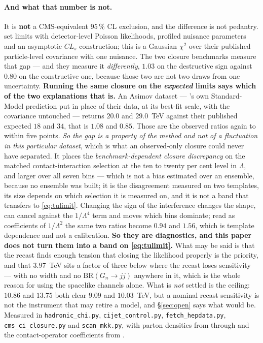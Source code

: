\documentclass[11pt,a4paper]{article}
\begin{document}
\paragraph{And what that number is not.} It is \textbf{not} a CMS-equivalent $95\,\%$ CL
exclusion, and the difference is not pedantry. \cite{CMSangular} set limits with detector-level
Poisson likelihoods, profiled nuisance parameters and an asymptotic $CL_s$ construction; this is a
Gaussian $\chi^2$ over their published particle-level covariance with one nuisance. The two
closure benchmarks measure that gap --- and they measure it \emph{differently}, $1.03$ on the
destructive sign against $0.80$ on the constructive one, because those two are not two draws from
one uncertainty. \textbf{Running the same closure on the \emph{expected} limits says which of the
two explanations that is.} An Asimov dataset --- \cite{CMSangular}'s own Standard-Model prediction
put in place of their data, at its best-fit scale, with the covariance untouched --- returns $20.0$
and $29.0$~TeV against their published expected $18$ and $34$, that is $1.08$ and $0.85$. Those
are the observed ratios again to within five points. \emph{So the gap is a property of the method
and not of a fluctuation in this particular dataset}, which is what an observed-only closure could
never have separated. It places the \emph{benchmark-dependent closure discrepancy} on the matched
contact-interaction selection at the ten to twenty per cent level in $\Lambda$, and larger over all
seven bins --- which is not a bias estimated over an ensemble, because no
ensemble was built; it is the disagreement measured on two templates, its size depends on which
selection it is measured on, and it is not a band that
transfers to \eqref{eq:tulimit}. Changing the sign of the interference changes the shape, can cancel against the
$1/\Lambda^4$ term and moves which bins dominate; read as coefficients of $1/\Lambda^2$ the same
two ratios become $0.94$ and $1.56$, which is template dependence and not a calibration.
\textbf{So they are diagnostics, and this paper does not turn them into a band on
\eqref{eq:tulimit}.} What may be said is that the recast finds enough tension that closing the
likelihood properly is the priority, and that $3.97$~TeV sits a factor of three below where the
recast loses sensitivity --- with no width and no $\mathrm{BR}(G_n\to jj)$ anywhere in it, which is
the whole reason for using the spacelike channels alone. What is \emph{not} settled is the
ceiling: $10.86$ and $13.75$ both clear $9.09$ and $10.03$~TeV, but a nominal recast sensitivity is
not the instrument that may retire a model, and \S\ref{sec:open} says what would be. Measured in
\texttt{hadronic\_\allowbreak chi.py}, \texttt{cijet\_\allowbreak control.py},
\texttt{fetch\_\allowbreak hepdata.py}, \texttt{cms\_\allowbreak ci\_\allowbreak closure.py} and
\texttt{scan\_\allowbreak mkk.py}, with parton densities from \cite{CT10} through
\cite{LHAPDF} and the contact-operator coefficients from \cite{CIJET}.
\end{document}
